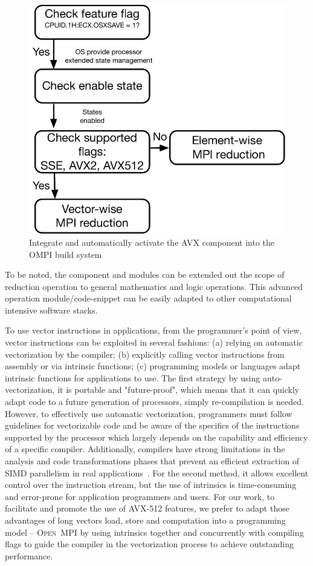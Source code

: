 \documentclass[sigconf]{acmart}
\newcommand{\ompi}[0]{\textsc{Open~MPI}\xspace}
\begin{document}
\begin{figure}[h]
    \centering
    \includegraphics[scale=.45]{avx-graph.pdf}
    \caption{Integrate and automatically activate the AVX component into the OMPI build system}
    \label{fig:512flow}
\end{figure}

To be noted, the component and modules can be
extended out the scope of reduction operation to general mathematics and logic operations.
This advanced operation module/code-snippet can be easily adapted to other computational intensive software stacks.

To use vector instructions in applications, from the programmer's point of view,
vector instructions can be exploited in several fashions: (a) relying on automatic vectorization by the
compiler; (b) explicitly calling vector
instructions from assembly or via intrinsic functions; (c) programming models or languages adapt
intrinsic functions for applications to use.
The first strategy by using auto-vectorization,
it is portable and "future-proof", which means that it can quickly adapt code to
a future generation of processors, simply re-compilation is needed. However,
to effectively use automatic vectorization, programmers must follow
guidelines for vectorizable code and be aware of the specifics of the instructions supported
by the processor which largely depends on the capability and efficiency of a specific compiler.
Additionally, compilers have strong limitations in the analysis and code transformations phases
that prevent an efficient extraction of SIMD parallelism in real applications~\cite{auto_Evaluation}.
For the second method, it allows excellent control over the instruction stream, but the use of
intrinsics is time-consuming and error-prone for application programmers and users.
For our work, to facilitate and promote the use of AVX-512 features, we
prefer to adapt those advantages of long vectors load, store and computation
into a programming model --  \ompi by using intrinsics together and concurrently with compiling flags
to guide the compiler in the vectorization process to achieve outstanding performance.
\end{document}
